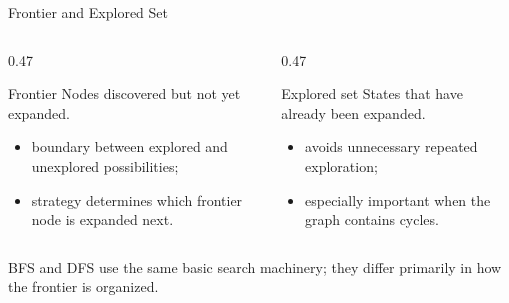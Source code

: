 \documentclass[aspectratio=169,10pt]{beamer}
\begin{document}
\begin{frame}[shrink=20]{Frontier and Explored Set}
  \begin{columns}[T,onlytextwidth]
    \begin{column}{0.47\textwidth}
      \begin{block}{Frontier}
        Nodes discovered but not yet expanded.
      \end{block}
      \begin{itemize}
        \item boundary between explored and unexplored possibilities;
        \item strategy determines which frontier node is expanded next.
      \end{itemize}
    \end{column}

    \begin{column}{0.47\textwidth}
      \begin{block}{Explored set}
        States that have already been expanded.
      \end{block}
      \begin{itemize}
        \item avoids unnecessary repeated exploration;
        \item especially important when the graph contains cycles.
      \end{itemize}
    \end{column}
  \end{columns}

  \begin{keyidea}
    BFS and DFS use the same basic search machinery; they differ primarily in how the frontier is organized.
  \end{keyidea}
\end{frame}
\end{document}
